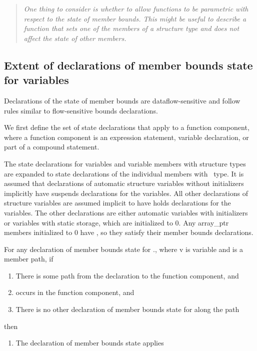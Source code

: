 \begin{quote}
\emph{One thing to consider is whether to allow functions to be
parametric with respect to the state of member bounds. This might be
useful to describe a function that sets one of the members of a
structure type and does not affect the state of other members.}
\end{quote}

\subsection{Extent of declarations of member bounds state for variables}

Declarations of the state of member bounds are dataflow-sensitive and
follow rules similar to flow-sensitive bounds declarations.

We first define the set of state declarations that apply to a function
component, where a function component is an expression statement,
variable declaration, or part of a compound statement.

The state declarations for variables and variable members with structure
types are expanded to state declarations of the individual members with
\arrayptr\ type. It is assumed that declarations of automatic
structure variables without initializers implicitly have suspends
declarations for the variables. All other declarations of structure
variables are assumed implicit to have holds declarations for the
variables. The other declarations are either automatic variables with
initializers or variables with static storage, which are initialized to
0. Any array\_ptr members initialized to 0 have \boundsany, so
they satisfy their member bounds declarations.

For any declaration of member bounds state for ., where
v is variable and  is a member path, if

\begin{enumerate}
\item
  There is some path from the declaration to the function component, and
\item
   occurs in the function component, and
\item
  There is no other declaration of member bounds state for 
  along the path
\end{enumerate}

then

\begin{enumerate}
\item
  The declaration of member bounds state applies
\end{enumerate}

